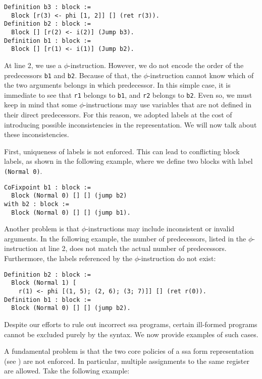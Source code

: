 \begin{lstlisting}[style=Rocq]
Definition b3 : block :=
  Block [r(3) <- phi [1, 2]] [] (ret r(3)).
Definition b2 : block :=
  Block [] [r(2) <- i(2)] (Jump b3).
Definition b1 : block :=
  Block [] [r(1) <- i(1)] (Jump b2).
\end{lstlisting}

At line 2, we use a $\phi$-instruction. However, we do not encode the order of the predecessors \texttt{b1} and \texttt{b2}. Because of that, the $\phi$-instruction cannot know which of the two arguments belongs in which predecessor. In this simple case, it is immediate to see that \texttt{r1} belongs to \texttt{b1}, and \texttt{r2} belongs to \texttt{b2}. Even so, we must keep in mind that some $\phi$-instructions may use variables that are not defined in their direct predecessors. For this reason, we adopted labels at the cost of introducing possible inconsistencies in the representation. We will now talk about these inconsistencies.

First, uniqueness of labels is not enforced. This can lead to conflicting block labels, as shown in the following example, where we define two blocks with label \texttt{(Normal 0)}.

\begin{lstlisting}[style=Rocq]
CoFixpoint b1 : block :=
  Block (Normal 0) [] [] (jump b2)
with b2 : block :=
  Block (Normal 0) [] [] (jump b1).
\end{lstlisting}

Another problem is that $\phi$-instructions may include inconsistent or invalid arguments. In the following example, the number of predecessors, listed in the $\phi$-instruction at line 2, does not match the actual number of predecessors. Furthermore, the labels referenced by the $\phi$-instruction do not exist:

\begin{lstlisting}[style=Rocq]
Definition b2 : block :=
  Block (Normal 1) [
    r(1) <- phi [(1, 5); (2, 6); (3; 7)]] [] (ret r(0)).
Definition b1 : block :=
  Block (Normal 0) [] [] (jump b2).
\end{lstlisting}

Despite our efforts to rule out incorrect \gls{ssa} programs, certain ill-formed programs cannot be excluded purely by the syntax. We now provide examples of such cases.

A fundamental problem is that the two core policies of a \gls{ssa} form representation (see ) are not enforced. In particular, multiple assignments to the same register are allowed. Take the following example:

